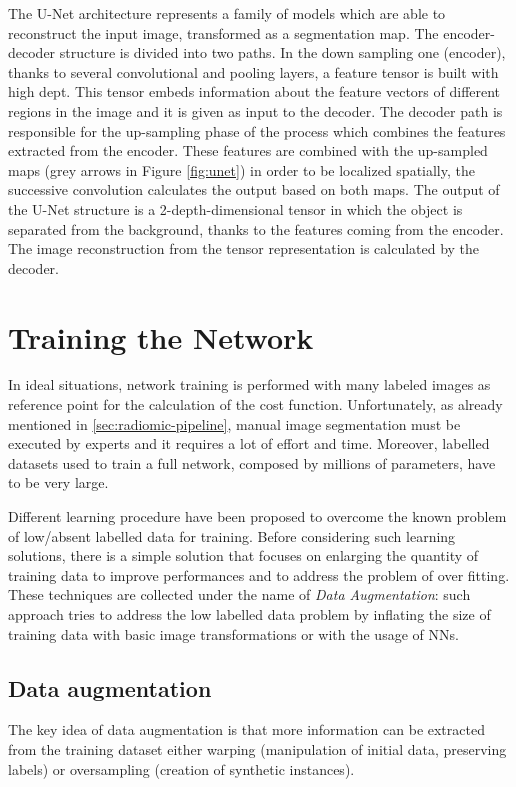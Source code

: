 \documentclass[../main.tex]{subfiles}
\begin{document}
The U-Net architecture represents a family of models which are able to reconstruct the input image, transformed as a segmentation map.
The encoder-decoder structure is divided into two paths.
In the down sampling one (encoder), thanks to several convolutional and pooling layers, a feature tensor is built with high dept. 
This tensor embeds information about the feature vectors of different regions in the image and it is given as input to the decoder.
The decoder path is responsible for the up-sampling phase of the process which combines the features extracted from the encoder.
These features are combined with the up-sampled maps (grey arrows in Figure \ref{fig:unet}) in order to be localized spatially, the successive convolution calculates the output based on both maps. 
The output of the U-Net structure is a 2-depth-dimensional tensor in which the object is separated from the background, thanks to the features coming from the encoder.
The image reconstruction from the tensor representation is calculated by the decoder.


\section{Training the Network}

In ideal situations, network training is performed with many labeled images as reference point for the calculation of the cost function. 
Unfortunately, as already mentioned in \ref{sec:radiomic-pipeline}, manual image segmentation must be executed by experts and it requires a lot of effort and time.
Moreover, labelled datasets used to train a full network, composed by millions of parameters, have to be very large. 

Different learning procedure have been proposed to  overcome the known problem of low/absent labelled data for training.
Before considering such learning solutions, there is a simple solution that focuses on enlarging the quantity of training data to improve performances and to address the problem of over fitting.
These techniques are collected under the name of \textit{Data Augmentation}: such approach tries to address the low labelled data problem by inflating the size of training data with basic image transformations or with the usage of NNs.

\subsection{Data augmentation}

The key idea of data augmentation is that more information can be extracted from the training dataset either warping (manipulation of initial data, preserving labels) or oversampling (creation of synthetic instances).
\end{document}
